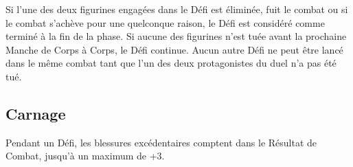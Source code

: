 Si l'une des deux figurines engagées dans le Défi est éliminée, fuit le combat ou si le combat s'achève pour une quelconque raison, le Défi est considéré comme terminé à la fin de la phase. Si aucune des figurines n'est tuée avant la prochaine Manche de Corps à Corps, le Défi continue. Aucun autre Défi ne peut être lancé dans le même combat tant que l'un des deux protagonistes du duel n'a pas été tué.

\subsection{Carnage}

Pendant un Défi, les blessures excédentaires comptent dans le Résultat de Combat, jusqu'à un maximum de +3.
